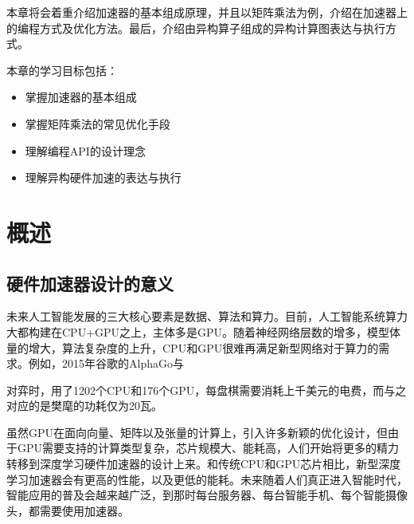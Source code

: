 \documentclass[letterpaper,10pt,english]{sphinxmanual}
\begin{document}
\sphinxAtStartPar
本章将会着重介绍加速器的基本组成原理，并且以矩阵乘法为例，介绍在加速器上的编程方式及优化方法。最后，介绍由异构算子组成的异构计算图表达与执行方式。

\sphinxAtStartPar
本章的学习目标包括：
\begin{itemize}
\item {} 
\sphinxAtStartPar
掌握加速器的基本组成

\item {} 
\sphinxAtStartPar
掌握矩阵乘法的常见优化手段

\item {} 
\sphinxAtStartPar
理解编程API的设计理念

\item {} 
\sphinxAtStartPar
理解异构硬件加速的表达与执行

\end{itemize}


\section{概述}
\label{\detokenize{chapter_accelerator/accelerator_introduction:id1}}\label{\detokenize{chapter_accelerator/accelerator_introduction::doc}}

\subsection{硬件加速器设计的意义}
\label{\detokenize{chapter_accelerator/accelerator_introduction:id2}}
\sphinxAtStartPar
未来人工智能发展的三大核心要素是数据、算法和算力。目前，人工智能系统算力大都构建在CPU+GPU之上，主体多是GPU。随着神经网络层数的增多，模型体量的增大，算法复杂度的上升，CPU和GPU很难再满足新型网络对于算力的需求。例如，2015年谷歌的AlphaGo与%
\begin{footnote}[23]\sphinxAtStartFootnote
{}
%
\end{footnote}对弈时，用了1202个CPU和176个GPU，每盘棋需要消耗上千美元的电费，而与之对应的是樊麾的功耗仅为20瓦。

\sphinxAtStartPar
虽然GPU在面向向量、矩阵以及张量的计算上，引入许多新颖的优化设计，但由于GPU需要支持的计算类型复杂，芯片规模大、能耗高，人们开始将更多的精力转移到深度学习硬件加速器的设计上来。和传统CPU和GPU芯片相比，新型深度学习加速器会有更高的性能，以及更低的能耗。未来随着人们真正进入智能时代，智能应用的普及会越来越广泛，到那时每台服务器、每台智能手机、每个智能摄像头，都需要使用加速器。
\end{document}
